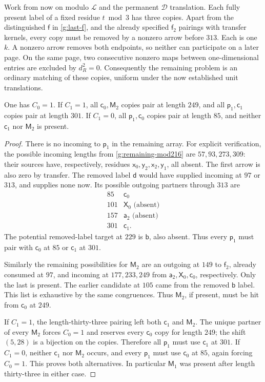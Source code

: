Work from now on modulo $\mathcal L$ and the permanent
$\mathcal D$ translation.  Each fully present label
of a fixed residue $t\bmod3$ has three copies.
Apart from the distinguished $\mathsf f$ in
\eqref{g:last-f}, and the already specified
$\mathsf f_2$ pairings with transfer kernels,
every copy must be removed by a nonzero arrow
before $313$.  Each is one $k$.  A nonzero arrow removes both
endpoints, so neither can participate on a later page.
On the same page, two consecutive nonzero maps between
one-dimensional entries are excluded by $d_R^2=0$.
Consequently the remaining problem is an ordinary
matching of these copies, uniform under the now
established unit translations.

\begin{lemma}\label{g:p1-matching}
One has $C_0=1$.  If $C_1=1$, all
$\mathsf c_0,\mathsf M_2$ copies pair at length
$249$, and all $\mathsf p_1,\mathsf c_1$ copies
pair at length $301$.  If $C_1=0$, all
$\mathsf p_1,\mathsf c_0$ copies pair at length
$85$, and neither $\mathsf c_1$ nor
$\mathsf M_2$ is present.
\end{lemma}

\begin{proof}
There is no incoming to $\mathsf p_1$ in the
remaining array.  For explicit verification,
the possible incoming lengths from
\eqref{g:remaining-mod216} are $57,93,273,309$:
their sources have, respectively, residues
$\mathsf x_0,\mathsf y_2,\mathsf x_2,
\mathsf y_1$, all absent.  The first arrow is
also zero by transfer.  The removed label
$\mathsf d$ would have supplied incoming at
$97$ or $313$, and supplies none now.
Its possible outgoing partners through $313$
are
\[
 \begin{array}{c|c}
 85&\mathsf c_0\\
 101&\mathsf X_0\text{ (absent)}\\
 157&\mathsf a_2\text{ (absent)}\\
 301&\mathsf c_1.
 \end{array}
\]
The potential removed-label target at $229$ is
$\mathsf b$, also absent.  Thus every
$\mathsf p_1$ must pair with $\mathsf c_0$ at
$85$ or $\mathsf c_1$ at $301$.

Similarly the remaining possibilities for
$\mathsf M_2$ are an outgoing at $149$ to
$\mathsf f_2$, already consumed at $97$, and
incoming at $177,233,249$ from
$\mathsf a_2,\mathsf X_0,\mathsf c_0$,
respectively.  Only the last is present.  The
earlier candidate at $105$ came from the
removed $\mathsf b$ label.  This list is
exhaustive by the same congruences.  Thus
$\mathsf M_2$, if present, must be hit from
$\mathsf c_0$ at $249$.

If $C_1=1$, the length-thirty-three pairing
left both $\mathsf c_1$ and $\mathsf M_2$.
The unique partner of every $\mathsf M_2$
forces $C_0=1$ and reserves every
$\mathsf c_0$ copy for length $249$; the
shift $(5,28)$ is a bijection on the copies.
Therefore all $\mathsf p_1$ must use
$\mathsf c_1$ at $301$.
If $C_1=0$, neither $\mathsf c_1$ nor
$\mathsf M_2$ occurs, and every
$\mathsf p_1$ must use $\mathsf c_0$ at
$85$, again forcing $C_0=1$.  This proves
both alternatives.  In particular
$\mathsf M_1$ was present after length
thirty-three in either case.
\end{proof}

